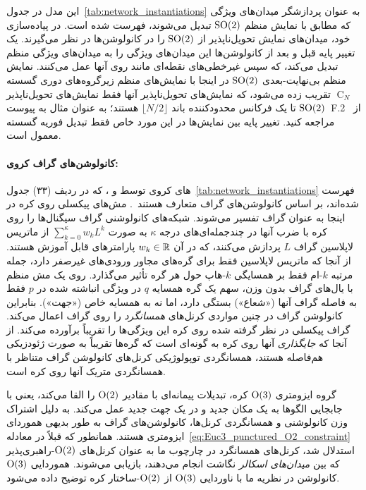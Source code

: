 این مدل در جدول~\ref{tab:network_instantiations} به عنوان پردازشگر میدان‌های ویژگی که مطابق با نمایش منظم $\operatorname{SO}(2)$ تبدیل می‌شوند، فهرست شده است.
در پیاده‌سازی خود، \citet{kicanaoglu2019gaugeSphere} میدان‌های نمایش تحویل‌ناپذیر از $\operatorname{SO}(2)$ را در کانولوشن‌ها در نظر می‌گیرند.
یک تغییر پایه قبل و بعد از کانولوشن‌ها این میدان‌های ویژگی را به میدان‌های ویژگی منظم تبدیل می‌کند، که سپس غیرخطی‌های نقطه‌ای مانند  روی آنها عمل می‌کنند.
نمایش منظم بی‌نهایت-بعدی $\operatorname{SO}(2)$ در اینجا با نمایش‌های منظم زیرگروه‌های دوری گسسته $\operatorname{C}_N$ تقریب زده می‌شود، که نمایش‌های تحویل‌ناپذیر آنها فقط نمایش‌های تحویل‌ناپذیر $\operatorname{SO}(2)$ تا یک فرکانس محدودکننده باند $\lfloor N/2 \rfloor$ هستند؛ به عنوان مثال به پیوست~F.2 از~\cite{Weiler2019_E2CNN} مراجعه کنید.
تغییر پایه بین نمایش‌ها در این مورد خاص فقط تبدیل فوریه گسسته معمول است.


\paragraph{کانولوشن‌های گراف کروی:}

های کروی توسط \citet{perraudin2018DeepSphere} و \citet{yang2020rotation}، که در ردیف (۳۳) جدول~\ref{tab:network_instantiations} فهرست شده‌اند، بر اساس کانولوشن‌های گراف متعارف هستند~\cite{kipf2016semi}.
مش‌های پیکسلی روی کره در اینجا به عنوان گراف تفسیر می‌شوند.
شبکه‌های کانولوشنی گراف سیگنال‌ها را روی کره با ضرب آنها در چندجمله‌ای‌های درجه $\kappa$ به صورت $\sum_{k=0}^\kappa w_k L^k$ از ماتریس لاپلاسین گراف $L$ پردازش می‌کنند، که در آن $w_k \in \mathbb{R}$ پارامترهای قابل آموزش هستند.
از آنجا که ماتریس لاپلاسین فقط برای گره‌های مجاور ورودی‌های غیرصفر دارد، جمله مرتبه $k$-ام فقط بر همسایگی $k$-هاپ حول هر گره تأثیر می‌گذارد.
روی یک مش منظم با یال‌های گراف بدون وزن، سهم یک گره همسایه $q$ در ویژگی انباشته شده در $p$ فقط به فاصله گراف آنها («شعاع») بستگی دارد، اما نه به همسایه خاص («جهت»).
بنابراین کانولوشن گراف در چنین مواردی کرنل‌های \emph{همسانگرد} را روی گراف اعمال می‌کند.
گراف پیکسلی در نظر گرفته شده روی کره این ویژگی‌ها را تقریباً برآورده می‌کند.
از آنجا که \emph{جایگذاری} آنها روی کره به گونه‌ای است که گره‌ها تقریباً به صورت ژئودزیکی هم‌فاصله هستند، همسانگردی توپولوژیکی کرنل‌های کانولوشن گراف متناظر با همسانگردی متریک آنها روی کره است.


گروه ایزومتری $\operatorname{O}(3)$ کره، تبدیلات پیمانه‌ای با مقادیر $\operatorname{O}(2)$ را القا می‌کند، یعنی با جابجایی الگوها به یک مکان جدید و در یک جهت جدید عمل می‌کند.
به دلیل اشتراک وزن کانولوشنی و همسانگردی کرنل‌ها، کانولوشن‌های گراف به طور بدیهی هموردای ایزومتری هستند.
همانطور که قبلاً در معادله~\eqref{eq:Euc3_punctured_O2_constraint} استدلال شد، کرنل‌های همسانگرد در چارچوب ما به عنوان کرنل‌های $\operatorname{O}(2)$-راهبری‌پذیر که بین \emph{میدان‌های اسکالر} نگاشت انجام می‌دهند، بازیابی می‌شوند.
هموردایی $\operatorname{O}(3)$ کانولوشن در نظریه ما با ناوردایی $\operatorname{O}(3)$ از $\operatorname{O}(2)$-ساختار کره توضیح داده می‌شود.



